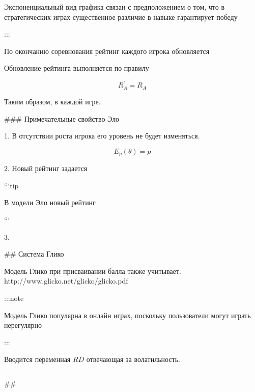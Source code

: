     Экспоненциальный вид графика связан с предположением о том, что в стратегических играх существенное различие в навыке гарантирует победу

:::

По окончанию соревнования рейтинг каждого игрока обновляется

Обновление рейтинга выполняется по правилу

$$
    R^'_A = R_A
$$


Таким образом, в каждой игре.

### Примечательные свойство Эло


1. В отсутствии роста игрока его уровень не будет изменяться.

$$
    E_p(\theta) = p 
$$


2. Новый рейтинг задается 
 
```tip

    В модели Эло новый рейтинг

```


3.



## Система Глико

Модель Глико при присваивании балла также учитывает. http://www.glicko.net/glicko/glicko.pdf

:::note

    Модель Глико популярна в онлайн играх, поскольку пользователи могут играть нерегулярно

:::

Вводится переменная $RD$ отвечающая за волатильность.

$$
    
$$


##

$$

$$